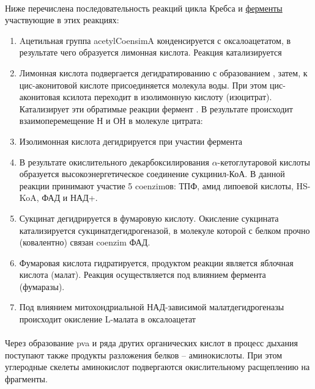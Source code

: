 \paragraph*{}Ниже перечислена последовательность реакций цикла Кребса и \hyperlink{enzimes}{ферменты} участвующие в этих реакциях:

\begin{enumerate}

\item Aцетильная группа \gls{acetylCoensimA} конденсируется с оксалоацетатом, в результате чего образуется лимонная кислота. Реакция катализируется 

\item Лимонная кислота подвергается дегидратированию с образованием , затем, к цис-аконитовой кислоте присоединяется молекула воды. При этом цис-аконитовая ксилота переходит в изолимонную кислоту (изоцитрат). Катализирует эти обратимые реакции фермент . В результате происходит взаимоперемещение Н и ОН в молекуле цитрата:

\item Изолимонная кислота дегидрируется при участии фермента 

\item В результате окислительного декарбоксилирования $\alpha$-кетоглутаровой кислоты образуется высокоэнергетическое соединение сукцинил-КоА. В данной реакции принимают участие 5 \gls{coenzim}ов: ТПФ, амид липоевой кислоты, HS-KoA, ФАД и НАД+.

\item Сукцинат дегидрируется в фумаровую кислоту. Окисление сукцината катализируется сукцинатдегидрогеназой, в молекуле которой с белком прочно (ковалентно) связан \gls{coenzim} ФАД. 

\item Фумаровая кислота гидратируется, продуктом реакции является яблочная кислота (малат). Реакция осуществляется под влиянием фермента  (фумаразы).

\item Под влиянием митохондриальной НАД-зависимой малатдегидрогеназы происходит окисление L-малата в оксалоацетат

\end{enumerate}

\paragraph*{}Через образование \gls{pva} и ряда других органических кислот в процесс дыхания поступают также продукты разложения белков -- аминокислоты. При этом углеродные скелеты аминокислот подвергаются окислительному расщеплению на фрагменты. 

